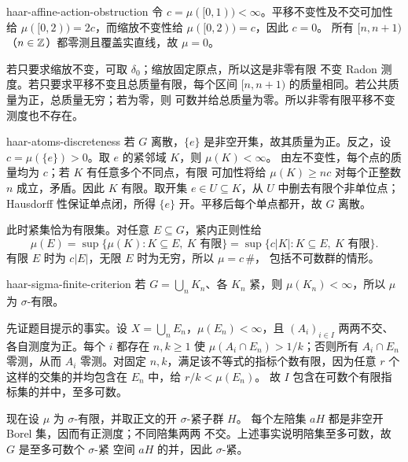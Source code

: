 \begin{solution}{haar-affine-action-obstruction}
令 $c=\mu([0,1))<\infty$。平移不变性及不交可加性给
$\mu([0,2))=2c$，而缩放不变性给 $\mu([0,2))=c$，因此 $c=0$。
所有 $[n,n+1)$（$n\in\mathbb{Z}$）都零测且覆盖实直线，故 $\mu=0$。

若只要求缩放不变，可取 $\delta_0$；缩放固定原点，所以这是非零有限
不变 Radon 测度。若只要求平移不变且总质量有限，每个区间
$[n,n+1)$ 的质量相同。若公共质量为正，总质量无穷；若为零，则
可数并给总质量为零。所以非零有限平移不变测度也不存在。
\end{solution}

\begin{solution}{haar-atoms-discreteness}
若 $G$ 离散，$\{e\}$ 是非空开集，故其质量为正。反之，设
$c=\mu(\{e\})>0$。取 $e$ 的紧邻域 $K$，则 $\mu(K)<\infty$。
由左不变性，每个点的质量均为 $c$；若 $K$ 有任意多个不同点，有限
可加性将给 $\mu(K)\ge nc$ 对每个正整数 $n$ 成立，矛盾。因此 $K$
有限。取开集 $e\in U\subseteq K$，从 $U$ 中删去有限个非单位点；
Hausdorff 性保证单点闭，所得 $\{e\}$ 开。平移后每个单点都开，故
$G$ 离散。

此时紧集恰为有限集。对任意 $E\subseteq G$，紧内正则性给
\[
 \mu(E)=\sup\{\mu(K):K\subseteq E,\ K\text{ 有限}\}
 =\sup\{c|K|:K\subseteq E,\ K\text{ 有限}\}.
\]
有限 $E$ 时为 $c|E|$，无限 $E$ 时为无穷，所以 $\mu=c\,\#$，
包括不可数群的情形。
\end{solution}

\begin{solution}{haar-sigma-finite-criterion}
若 $G=\bigcup_nK_n$、各 $K_n$ 紧，则 $\mu(K_n)<\infty$，所以
$\mu$ 为 $\sigma$-有限。

先证题目提示的事实。设 $X=\bigcup_n E_n$，$\mu(E_n)<\infty$，且
$(A_i)_{i\in I}$ 两两不交、各自测度为正。每个 $i$ 都存在 $n,k\ge1$
使 $\mu(A_i\cap E_n)>1/k$；否则所有 $A_i\cap E_n$ 零测，从而
$A_i$ 零测。对固定 $n,k$，满足该不等式的指标个数有限，因为任意
$r$ 个这样的交集的并均包含在 $E_n$ 中，给 $r/k<\mu(E_n)$。
故 $I$ 包含在可数个有限指标集的并中，至多可数。

现在设 $\mu$ 为 $\sigma$-有限，并取正文的开 $\sigma$-紧子群 $H$。
每个左陪集 $aH$ 都是非空开 Borel 集，因而有正测度；不同陪集两两
不交。上述事实说明陪集至多可数，故 $G$ 是至多可数个 $\sigma$-紧
空间 $aH$ 的并，因此 $\sigma$-紧。
\end{solution}

